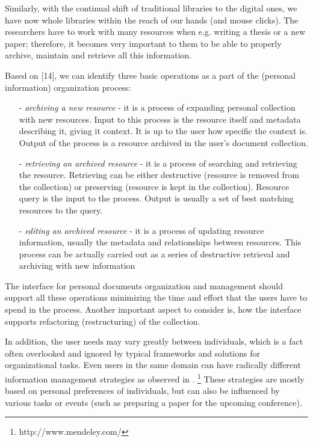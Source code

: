 \documentclass[12pt]{article}
\begin{document}
Similarly, with the continual shift of traditional libraries to the digital ones, we have now whole libraries within the reach of our hands (and mouse clicks). The researchers have to work with many resources when e.g. writing a thesis or a new paper; therefore, it becomes very important to them to be able to properly archive, maintain and retrieve all this information. 

Based on [14], we can identify three basic operations as a part of the (personal information) organization process: 


 
 \begin{itemize}
        \item[-] \textit{archiving a new resource } - it is a process of expanding personal collection with new resources. Input to this process is the resource itself and metadata describing it, giving it context. It is up to the user how specific the context is. Output of the process is a resource archived in the user’s document collection.
        \item[-] \textit{retrieving an archived resource } - it is a process of searching and retrieving the resource. Retrieving can be either destructive (resource is removed from the collection) or preserving (resource is kept in the collection). Resource query is the input to the process. Output is usually a set of best matching resources to the query.
        \item[-] \textit{editing an archived resource } - it is a process of updating resource information, usually the metadata and relationships between resources. This process can be actually carried out as a series of destructive retrieval and archiving with new information
 \end{itemize}
 
The interface for personal documents organization and management should support all these operations minimizing the time and effort that the users have to spend in the process. Another important aspect to consider is, how the interface supports refactoring (restructuring) of the collection. 

In addition, the user needs may vary greatly between individuals, which is a fact often overlooked and ignored by typical frameworks and solutions for organizational tasks. Even users in the same domain can have radically different information management strategies as observed in . \footnote{http://www.mendeley.com/} 
These strategies are mostly based on personal preferences of individuals, but can also be influenced by various tasks or events (such as preparing a paper for the upcoming conference). 
\end{document}
